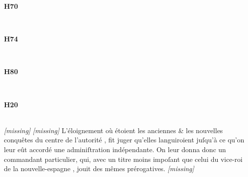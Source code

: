 \documentclass{book}
\begin{document}
	\thispagestyle{empty}           %
	\setlength{\columnsep}{3em}		%

	\newpage
	\begin{paracol}{4}
		\noindent
		\centerline{\textbf{H70}}\\
		\switchcolumn
		\noindent
		\centerline{\textbf{H74}}\\
		\switchcolumn
		\noindent
		\centerline{\textbf{H80}}\\
		\switchcolumn
		\noindent
		\centerline{\textbf{H20}}\\
		\switchcolumn*
		\emph{[missing]}
		\switchcolumn
		\emph{[missing]}
		\switchcolumn
		\noindent
L’éloignement où étoient les anciennes \& les nouvelles conquêtes du centre de l’autorité , fit juger qu’elles languiroient juſqu’à ce qu’on leur eût accordé une adminiſtration indépendante. On leur donna donc un commandant particulier, qui, avec un titre moins impoſant que celui du vice-roi de la nouvelle-espagne , jouit des mêmes prérogatives.		\switchcolumn
		\emph{[missing]}
		\switchcolumn
	\end{paracol}

\end{document}
